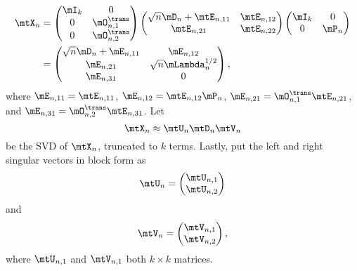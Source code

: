 \begin{align}
    \mtX_n
        &=
            \left(
            \begin{matrix}
                \mI_k & 0 \\
                0  & \mO_{n,1}^\trans \\
                0  & \mO_{n,2}^\trans
            \end{matrix}
            \right)
            \left(
            \begin{matrix}
                \sqrt{n} \mD_n + \mtE_{n,11} & \mtE_{n,12} \\
                \mtE_{n,21}                  & \mtE_{n,22}
            \end{matrix}
            \right)
            \left(
            \begin{matrix}
                \mI_k & 0 \\
                0     & \mP_n
            \end{matrix}
            \right) \notag \\
        &=
            \left(
            \begin{matrix}
                \sqrt{n} \mD_n + \mE_{n,11} & \mE_{n,12} \\
                \mE_{n,21}                  & \sqrt{n} \mLambda^{1/2}_n \\
                \mE_{n,31}                  & 0
            \end{matrix}
            \right),
\end{align}
where 
$\mE_{n,11} = \mtE_{n,11}$, 
$\mE_{n,12} = \mtE_{n,12} \mP_n$,
$\mE_{n,21} = \mO_{n,1}^\trans \mtE_{n,21}$, and
$\mE_{n,31} = \mO_{n,2}^\trans \mtE_{n,31}$.
Let
\[
    \mtX_n
    \approx
    \mtU_n \mtD_n \mtV_n
\]
be the SVD of $\mtX_n$, truncated to $k$ terms.  Lastly, put the left and right singular vectors in block form as
\begin{equation}
    \mtU_n
    =
    \left(
    \begin{matrix}
        \mtU_{n,1} \\
        \mtU_{n,2}
    \end{matrix}
    \right)
\end{equation}
and
\begin{equation}
    \mtV_n
    =
    \left(
    \begin{matrix}
        \mtV_{n,1} \\
        \mtV_{n,2}
    \end{matrix}
    \right),
\end{equation}
where $\mtU_{n,1}$ and $\mtV_{n,1}$ both $k\times k$ matrices.

